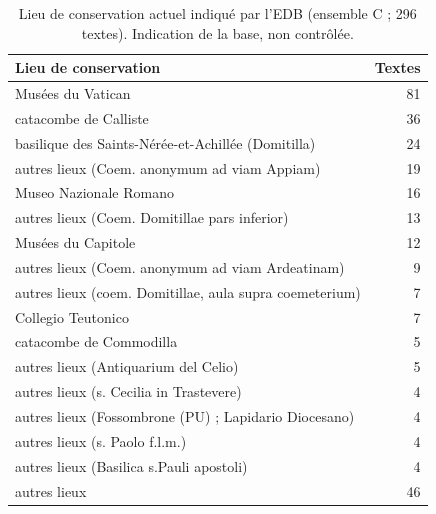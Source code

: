 \begin{table}[tbp]\centering\small\caption{Lieu de conservation actuel indiqué par l’EDB (ensemble C ; 296 textes). Indication de la base, non contrôlée.}\label{tab:conservation}
\begin{tabular}{@{}l r@{}}\toprule Lieu de conservation & Textes\\\midrule
Musées du Vatican & 81 \\
catacombe de Calliste & 36 \\
basilique des Saints-Nérée-et-Achillée (Domitilla) & 24 \\
autres lieux (Coem. anonymum ad viam Appiam) & 19 \\
Museo Nazionale Romano & 16 \\
autres lieux (Coem. Domitillae pars inferior) & 13 \\
Musées du Capitole & 12 \\
autres lieux (Coem. anonymum ad viam Ardeatinam) & 9 \\
autres lieux (coem. Domitillae, aula supra coemeterium) & 7 \\
Collegio Teutonico & 7 \\
catacombe de Commodilla & 5 \\
autres lieux (Antiquarium del Celio) & 5 \\
autres lieux (s. Cecilia in Trastevere) & 4 \\
autres lieux (Fossombrone (PU)   ; Lapidario Diocesano) & 4 \\
autres lieux (s. Paolo f.l.m.) & 4 \\
autres lieux (Basilica s.Pauli apostoli) & 4 \\
autres lieux & 46 \\
\bottomrule\end{tabular}\end{table}
